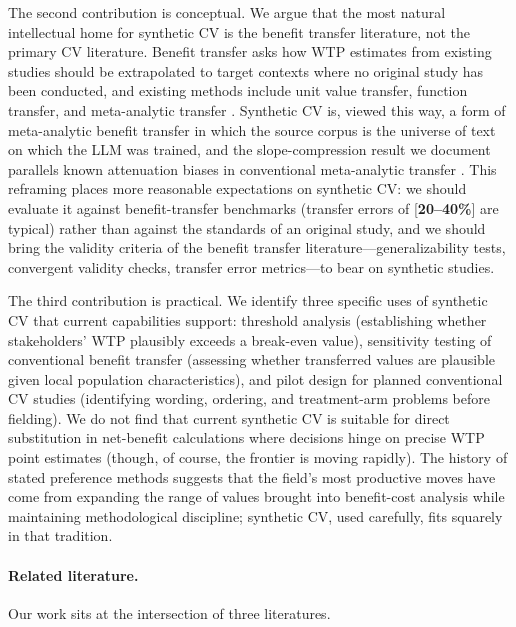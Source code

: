 \documentclass[12pt]{article}
\begin{document}
The second contribution is conceptual. We argue that the most natural intellectual home for synthetic CV is the benefit transfer literature, not the primary CV literature. Benefit transfer asks how WTP estimates from existing studies should be extrapolated to target contexts where no original study has been conducted, and existing methods include unit value transfer, function transfer, and meta-analytic transfer \parencite{Rosenberger2017, Loomis2015, Boyle2010}. Synthetic CV is, viewed this way, a form of meta-analytic benefit transfer in which the source corpus is the universe of text on which the LLM was trained, and the slope-compression result we document parallels known attenuation biases in conventional meta-analytic transfer \parencite{Bergstrom2008}. This reframing places more reasonable expectations on synthetic CV: we should evaluate it against benefit-transfer benchmarks (transfer errors of [\textbf{20--40\%}] are typical) rather than against the standards of an original study, and we should bring the validity criteria of the benefit transfer literature---generalizability tests, convergent validity checks, transfer error metrics---to bear on synthetic studies.

The third contribution is practical. We identify three specific uses of synthetic CV that current capabilities support: threshold analysis (establishing whether stakeholders' WTP plausibly exceeds a break-even value), sensitivity testing of conventional benefit transfer (assessing whether transferred values are plausible given local population characteristics), and pilot design for planned conventional CV studies (identifying wording, ordering, and treatment-arm problems before fielding). We do not find that current synthetic CV is suitable for direct substitution in net-benefit calculations where decisions hinge on precise WTP point estimates (though, of course, the frontier is moving rapidly). The history of stated preference methods suggests that the field's most productive moves have come from expanding the range of values brought into benefit-cost analysis while maintaining methodological discipline; synthetic CV, used carefully, fits squarely in that tradition.

\paragraph{Related literature.} Our work sits at the intersection of three literatures.
\end{document}
